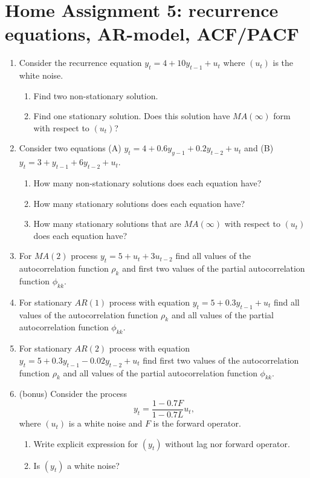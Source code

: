 \documentclass[12pt]{article}
\begin{document}
\section*{Home Assignment 5: recurrence equations, AR-model, ACF/PACF}
\begin{enumerate}
  \item Consider the recurrence equation $y_t = 4 + 10 y_{t-1} + u_t$ where $(u_t)$ is the white noise.
  \begin{enumerate}
    \item Find two non-stationary solution.
    \item Find one stationary solution. Does this solution have $MA(\infty)$ form with respect to $(u_t)$?
  \end{enumerate}

  \item Consider two equations (A) $y_t = 4 + 0.6 y_{y-1} + 0.2y_{t-2} + u_t$ and (B) $y_t = 3 + y_{t-1} + 6y_{t-2} + u_t$.
  
  \begin{enumerate}
    \item How many non-stationary solutions does each equation have?
    \item How many stationary solutions does each equation have?
    \item How many stationary solutions that are $MA(\infty)$ with respect to $(u_t)$ does each equation have?
  \end{enumerate}

  \item For $MA(2)$ process $y_t = 5 + u_t + 3u_{t-2}$ find all values of the autocorrelation function $\rho_k$ and 
  first two values of the partial autocorrelation function $\phi_{kk}$.

  \item For stationary $AR(1)$ process with equation $y_t = 5 + 0.3y_{t-1} + u_t$ find all values of the autocorrelation function $\rho_k$ and 
  all values of the partial autocorrelation function $\phi_{kk}$.

  \item For stationary $AR(2)$ process with equation $y_t = 5 + 0.3y_{t-1} - 0.02 y_{t-2} + u_t$ find first two values of the autocorrelation function $\rho_k$ and 
  all values of the partial autocorrelation function $\phi_{kk}$.

  \item (bonus) Consider the process 
  \[
  y_t = \frac{1-0.7F}{1-0.7L} u_t,
  \]
  where $(u_t)$ is a white noise and $F$ is the forward operator. 
  \begin{enumerate}
    \item Write explicit expression for $(y_t)$ without lag nor forward operator.
    \item Is $(y_t)$ a white noise?
  \end{enumerate}
\end{enumerate}
\end{document}
